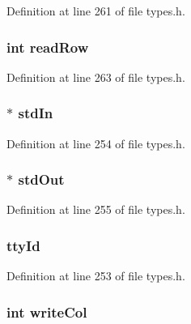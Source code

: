 Definition at line 261 of file types.h.

\hypertarget{structtty__s_a0aef55ec53e97b2ad384eb814d316e9b}{
\subsubsection[{readRow}]{\setlength{\rightskip}{0pt plus 5cm}int {\bf readRow}}}
\label{structtty__s_a0aef55ec53e97b2ad384eb814d316e9b}


Definition at line 263 of file types.h.

\hypertarget{structtty__s_a44c2fc56a32fd5125ebc51b6b2c0e178}{
\subsubsection[{stdIn}]{$\ast$ {\bf stdIn}}}
\label{structtty__s_a44c2fc56a32fd5125ebc51b6b2c0e178}


Definition at line 254 of file types.h.

\hypertarget{structtty__s_a0651a2e4ac304fdc5837a8eb0b0bd166}{
\subsubsection[{stdOut}]{$\ast$ {\bf stdOut}}}
\label{structtty__s_a0651a2e4ac304fdc5837a8eb0b0bd166}


Definition at line 255 of file types.h.

\hypertarget{structtty__s_a7bdcbca143d0773edef7d01762d42aff}{
\subsubsection[{ttyId}]{ {\bf ttyId}}}
\label{structtty__s_a7bdcbca143d0773edef7d01762d42aff}


Definition at line 253 of file types.h.

\hypertarget{structtty__s_ae1216492f5b395a931efcab6127d0160}{
\subsubsection[{writeCol}]{\setlength{\rightskip}{0pt plus 5cm}int {\bf writeCol}}}
\label{structtty__s_ae1216492f5b395a931efcab6127d0160}


